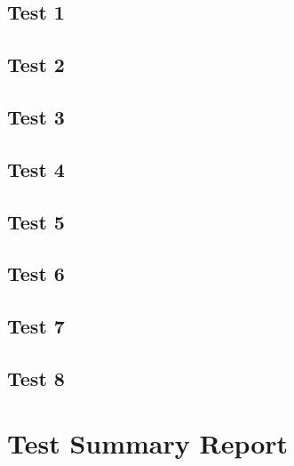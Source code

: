 \documentclass[11pt]{article}
\begin{document}
\subsection{Test 1}
\subsection{Test 2}
\subsection{Test 3}
\subsection{Test 4}
\subsection{Test 5}
\subsection{Test 6}
\subsection{Test 7}
\subsection{Test 8}

\section{Test Summary Report}%
\end{document}
